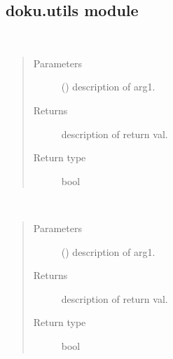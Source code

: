 \documentclass[letterpaper,10pt,english]{sphinxmanual}
\begin{document}
\subsection{doku.utils module}
\label{\detokenize{doku:module-doku.utils}}\label{\detokenize{doku:doku-utils-module}}

\begin{fulllineitems}
\label{\detokenize{doku:doku.utils.func_a}}~\begin{quote}\begin{description}
\item[{Parameters}] \leavevmode
\sphinxAtStartPar
{} () \textendash{} description of arg1.

\item[{Returns}] \leavevmode
\sphinxAtStartPar
description of return val.

\item[{Return type}] \leavevmode
\sphinxAtStartPar
bool

\end{description}\end{quote}

\end{fulllineitems}


\begin{fulllineitems}
\label{\detokenize{doku:doku.utils.func_b}}~\begin{quote}\begin{description}
\item[{Parameters}] \leavevmode
\sphinxAtStartPar
{} () \textendash{} description of arg1.

\item[{Returns}] \leavevmode
\sphinxAtStartPar
description of return val.

\item[{Return type}] \leavevmode
\sphinxAtStartPar
bool

\end{description}\end{quote}

\end{fulllineitems}
\end{document}

